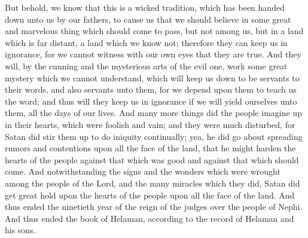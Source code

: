 But behold, we know that this is a wicked tradition, which has been handed down unto us by our fathers, to cause us that we should believe in some great and marvelous thing which should come to pass, but not among us, but in a land which is far distant, a land which we know not; therefore they can keep us in ignorance, for we cannot witness with our own eyes that they are true.
\bverse \iffalse And they will, by the cunning and the mysterious arts of the evil one, work some great mystery which we cannot understand, which will keep us down to be servants to their words, and also servants unto them, for we depend upon them to teach us the word; and thus will they keep us in ignorance if we will yield ourselves unto them, all the days of our lives. \fi
And they will, by the cunning and the mysterious arts of the evil one, work some great mystery which we cannot understand, which will keep us down to be servants to their words, and also servants unto them, for we depend upon them to teach us the word; and thus will they keep us in ignorance if we will yield ourselves unto them, all the days of our lives.
\bverse \iffalse And many more things did the people imagine up in their hearts, which were foolish and vain; and they were much disturbed, for Satan did stir them up to do iniquity continually; yea, he did go about spreading rumors and contentions upon all the face of the land, that he might harden the hearts of the people against that which was good and against that which should come. \fi
And many more things did the people imagine up in their hearts, which were foolish and vain; and they were much disturbed, for Satan did stir them up to do iniquity continually; yea, he did go about spreading rumors and contentions upon all the face of the land, that he might harden the hearts of the people against that which was good and against that which should come.
\bverse \iffalse And notwithstanding the signs and the wonders which were wrought among the people of the Lord, and the many miracles which they did, Satan did get great hold upon the hearts of the people upon all the face of the land. \fi
And notwithstanding the signs and the wonders which were wrought among the people of the Lord, and the many miracles which they did, Satan did get great hold upon the hearts of the people upon all the face of the land.
\bverse \iffalse And thus ended the ninetieth year of the reign of the judges over the people of Nephi. \fi
And thus ended the ninetieth year of the reign of the judges over the people of Nephi.
\bverse \iffalse And thus ended the book of Helaman, according to the record of Helaman and his sons. \fi
And thus ended the book of Helaman, according to the record of Helaman and his sons.



